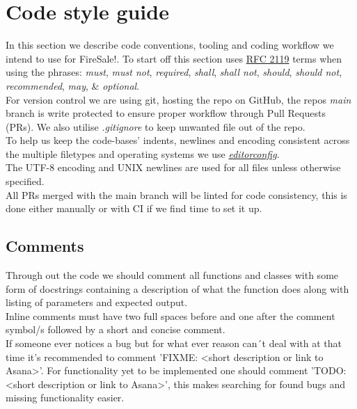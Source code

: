 \section{Code style guide}
In this section we describe code conventions, tooling and coding workflow we intend to use for FireSale!. To start off this section uses \href{https://datatracker.ietf.org/doc/html/rfc2119}{RFC 2119} 
terms when using the phrases: \textit{must}, \textit{must not}, \textit{required}, \textit{shall}, \textit{shall not}, \textit{should}, \textit{should not}, \textit{recommended}, \textit{may}, \& \textit{optional}.\\
 
For version control we are using git, hosting the repo on GitHub, the repos \textit{main} branch is write protected to ensure proper workflow through Pull Requests (PRs). We also utilise \textit{.gitignore} to keep unwanted file out of the repo.\\

To help us keep the code-bases' indents, newlines and encoding consistent across the multiple filetypes and operating systems we use \href{https://editorconfig.org}{\textit{editorconfig}}.\\

The UTF-8 encoding and UNIX newlines are used for all files unless otherwise specified.\\

All PRs merged with the main branch will be linted for code consistency, this is done either manually or with CI if we find time to set it up.

\subsection{Comments}
Through out the code we should comment all functions and classes with some form of docstrings containing a description of what the function does along with listing of parameters and expected output.\\

Inline comments must have two full spaces before and one after the comment symbol/s followed by a short and concise comment.\\

If someone ever notices a bug but for what ever reason can´t deal with at that time it's recommended to comment 'FIXME: <short description or link to Asana>'. For functionality yet to be implemented one should comment 'TODO: <short description or link to Asana>', this makes searching for found bugs and missing functionality easier.\\

